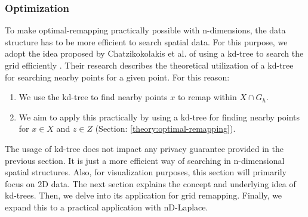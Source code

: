 \subsubsection{Optimization}
To make optimal-remapping practically possible with n-dimensions, the data structure has to be more efficient to search spatial data. For this purpose, we adopt the idea proposed by Chatzikokolakis et al. of using a kd-tree to search the grid efficiently \citep{chatzikokolakis_efficient_2017}.
Their research describes the theoretical utilization of a kd-tree for searching nearby points for a given point.
For this reason:
\begin{enumerate}
    \item     We use the kd-tree to find nearby points $x$ to remap within $X \cap G_h$.
    \item We aim to apply this practically by using a kd-tree for finding nearby points for $x \in X$ and $z \in Z$ (Section: \ref{theory:optimal-remapping}). 
\end{enumerate}
The usage of kd-tree does not impact any privacy guarantee provided in the previous section. It is just a more efficient way of searching in n-dimensional spatial structures. Also, for visualization purposes, this section will primarily focus on 2D data. \newline
The next section explains the concept and underlying idea of kd-trees.
Then, we delve into its application for grid remapping.
Finally, we expand this to a practical application with nD-Laplace.

